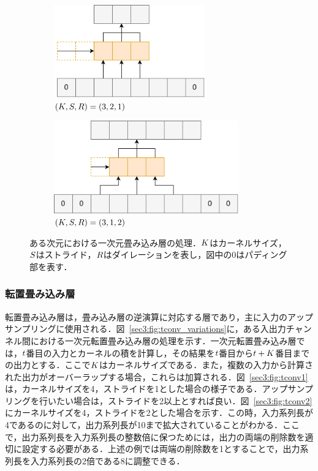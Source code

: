 \documentclass[12pt]{jarticle}
\numberwithin{equation}{section}    %
\numberwithin{figure}{section}      %
\numberwithin{table}{section}      %
\begin{document}
\begin{figure}[tb]
    \begin{subfigure}[b]{0.48\textwidth}
        \centering
        \includegraphics[height=4cm]{./figure/sec3/conv3.drawio.png}
        \caption{$(K, S, R) = (3, 2, 1)$}
        \label{sec3:fig:conv3}
    \end{subfigure}
    \begin{subfigure}[b]{0.48\textwidth}
        \centering
        \includegraphics[height=4cm]{./figure/sec3/conv4.drawio.png}
        \caption{$(K, S, R) = (3, 1, 2)$}
        \label{sec3:fig:conv4}
    \end{subfigure}
    \caption{ある次元における一次元畳み込み層の処理．$K$はカーネルサイズ，$S$はストライド，$R$はダイレーションを表し，図中の0はパディング部を表す．}
    \label{sec3:fig:conv_variations}
\end{figure}

\subsubsection{転置畳み込み層}
転置畳み込み層は，畳み込み層の逆演算に対応する層であり，主に入力のアップサンプリングに使用される．図~\ref{sec3:fig:tconv_variations}に，ある入出力チャンネル間における一次元転置畳み込み層の処理を示す．一次元転置畳み込み層では，$t$番目の入力とカーネルの積を計算し，その結果を$t$番目から$t + K$番目までの出力とする．ここで$K$はカーネルサイズである．また，複数の入力から計算された出力がオーバーラップする場合，これらは加算される．図~\ref{sec3:fig:tconv1}は，カーネルサイズを4，ストライドを1とした場合の様子である．アップサンプリングを行いたい場合は，ストライドを2以上とすれば良い．図~\ref{sec3:fig:tconv2}にカーネルサイズを4，ストライドを2とした場合を示す．この時，入力系列長が4であるのに対して，出力系列長が10まで拡大されていることがわかる．ここで，出力系列長を入力系列長の整数倍に保つためには，出力の両端の削除数を適切に設定する必要がある．上述の例では両端の削除数を1とすることで，出力系列長を入力系列長の2倍である8に調整できる．
\end{document}
